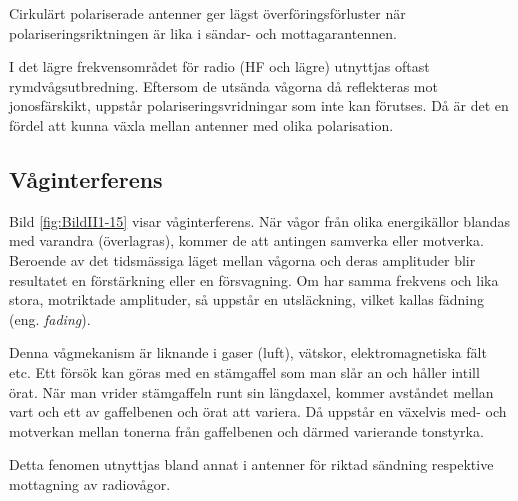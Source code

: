 Cirkulärt polariserade antenner ger lägst överföringsförluster när
polariseringsriktningen är lika i sän\-d\-ar- och mottagarantennen.

I det lägre frekvensområdet för radio (HF och lägre) utnyttjas oftast
rymdvågsutbredning.
Eftersom de utsända vågorna då reflekteras mot jonosfärskikt, uppstår
polariseringsvridningar som inte kan förutses.
Då är det en fördel att kunna växla mellan antenner med olika polarisation.

\subsection{Våginterferens}

Bild \ref{fig:BildII1-15} visar våginterferens.
När vågor från olika energikällor blandas med varandra (överlagras), kommer
de att antingen samverka eller motverka.
Beroende av det tidsmässiga läget mellan vågorna och deras amplituder blir
resultatet en förstärkning eller en försvagning.
Om har samma frekvens och lika stora, motriktade amplituder, så uppstår en
utsläckning, vilket kallas fädning (eng. \emph{fading}).

Denna vågmekanism är liknande i gaser (luft), vätskor, elektromagnetiska fält
etc.
Ett försök kan göras med en stämgaffel som man slår an och håller intill örat.
När man vrider stämgaffeln runt sin längdaxel, kommer avståndet mellan
vart och ett av gaffelbenen och örat att variera.
Då uppstår en växelvis med- och motverkan mellan tonerna från gaffelbenen och
därmed varierande tonstyrka.

Detta fenomen utnyttjas bland annat i antenner för riktad sändning respektive
mottagning av radiovågor.

